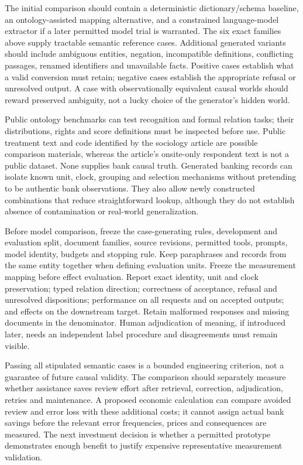 The initial comparison should contain a deterministic dictionary/schema
baseline, an ontology-assisted mapping alternative, and a constrained
language-model extractor if a later permitted model trial is warranted.
The six exact families above supply tractable semantic reference cases.
Additional generated variants should include ambiguous entities, negation,
incompatible definitions, conflicting passages, renamed identifiers and
unavailable facts. Positive cases establish what a valid conversion must
retain; negative cases establish the appropriate refusal or unresolved
output. A case with observationally equivalent causal worlds should reward
preserved ambiguity, not a lucky choice of the generator's hidden world.

Public ontology benchmarks can test recognition and formal relation tasks;
their distributions, rights and score definitions must be inspected before
use. Public treatment text and code identified by the sociology article are
possible comparison materials, whereas the article's onsite-only respondent
text is not a public dataset. None supplies bank causal truth. Generated
banking records can isolate known unit, clock, grouping and selection
mechanisms without pretending to be authentic bank observations. They also
allow newly constructed combinations that reduce straightforward lookup,
although they do not establish absence of contamination or real-world
generalization.

Before model comparison, freeze the case-generating rules, development and
evaluation split, document families, source revisions, permitted tools,
prompts, model identity, budgets and stopping rule. Keep paraphrases and
records from the same entity together when defining evaluation units. Freeze
the measurement mapping before effect evaluation. Report exact identity,
unit and clock preservation; typed relation direction; correctness of
acceptance, refusal and unresolved dispositions; performance on all requests
and on accepted outputs; and effects on the downstream target. Retain
malformed responses and missing documents in the denominator. Human
adjudication of meaning, if introduced later, needs an independent label
procedure and disagreements must remain visible.

Passing all stipulated semantic cases is a bounded engineering criterion,
not a guarantee of future causal validity. The comparison should separately
measure whether assistance saves review effort after retrieval, correction,
adjudication, retries and maintenance. A proposed economic calculation can
compare avoided review and error loss with these additional costs; it cannot
assign actual bank savings before the relevant error frequencies, prices
and consequences are measured. The next investment decision is whether a
permitted prototype demonstrates enough benefit to justify expensive
representative measurement validation.

